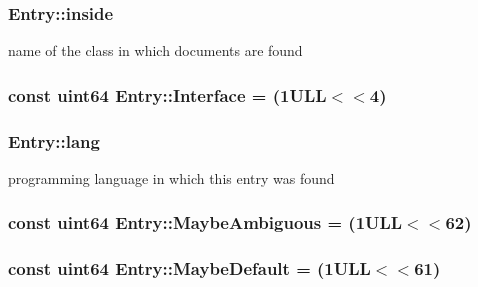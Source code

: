 \subsubsection[{inside}]{ Entry\+::inside}\label{class_entry_af88583a31bcd3cfc5aa52691f958833f}


name of the class in which documents are found 

\hypertarget{class_entry_ab880f63d6603f9ba28fcea37575ff7ce}{}
\subsubsection[{Interface}]{\setlength{\rightskip}{0pt plus 5cm}const {\bf uint64} Entry\+::\+Interface = (1\+U\+L\+L$<$$<$4)\hspace{0.3cm}{\ttfamily [static]}}\label{class_entry_ab880f63d6603f9ba28fcea37575ff7ce}
\hypertarget{class_entry_a4ee5bbd6ac8bdf2f017d93edcefce5e9}{}
\subsubsection[{lang}]{ Entry\+::lang}\label{class_entry_a4ee5bbd6ac8bdf2f017d93edcefce5e9}


programming language in which this entry was found 

\hypertarget{class_entry_ae3e84af12e322ab715e5ae191d92d1c7}{}
\subsubsection[{Maybe\+Ambiguous}]{\setlength{\rightskip}{0pt plus 5cm}const {\bf uint64} Entry\+::\+Maybe\+Ambiguous = (1\+U\+L\+L$<$$<$62)\hspace{0.3cm}{\ttfamily [static]}}\label{class_entry_ae3e84af12e322ab715e5ae191d92d1c7}
\hypertarget{class_entry_a7fd65cf61e33aa95cef95d5789f61063}{}
\subsubsection[{Maybe\+Default}]{\setlength{\rightskip}{0pt plus 5cm}const {\bf uint64} Entry\+::\+Maybe\+Default = (1\+U\+L\+L$<$$<$61)\hspace{0.3cm}{\ttfamily [static]}}\label{class_entry_a7fd65cf61e33aa95cef95d5789f61063}
\hypertarget{class_entry_ac4db81b56383103198fda03a5bfe32f7}{}
